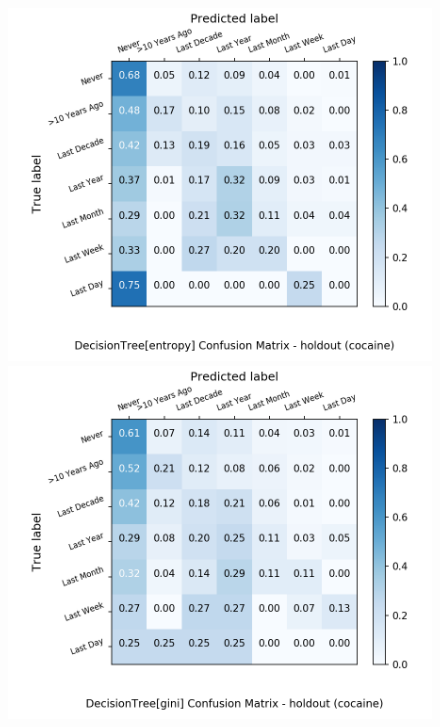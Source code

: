 \begin{figure}[H]
	\centering
	\begin{minipage}[b]{0.32\textwidth}
		\includegraphics[width=1.1\textwidth]{Plots/drugs/cocaine_DecisionTree_entropy_balance_False_holdout.png}
	\end{minipage}
	\begin{minipage}[b]{0.32\textwidth}
		\includegraphics[width=1.1\textwidth]{Plots/drugs/cocaine_DecisionTree_gini_balance_False_holdout.png}
	\end{minipage}

\end{figure}
